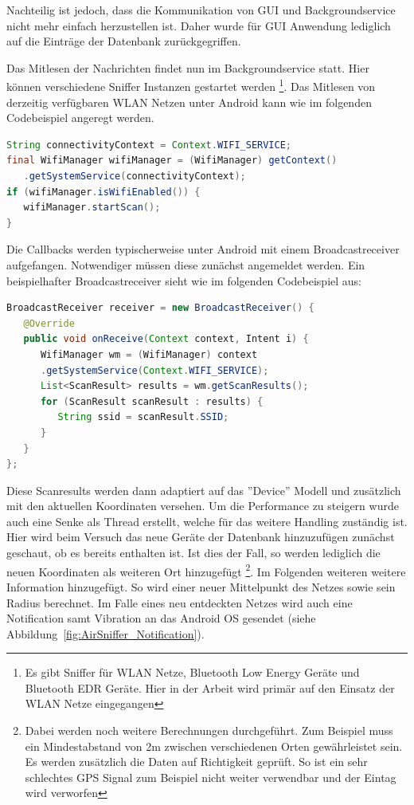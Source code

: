 \documentclass[11pt,a4paper]{article}
\begin{document}
Nachteilig ist jedoch, dass die Kommunikation von GUI und Backgroundservice nicht mehr einfach herzustellen ist. Daher wurde für GUI Anwendung lediglich auf die Einträge der Datenbank zurückgegriffen.

Das Mitlesen der Nachrichten findet nun im Backgroundservice statt. Hier können verschiedene Sniffer Instanzen gestartet werden
\footnote{Es gibt Sniffer für WLAN Netze, Bluetooth Low Energy Geräte und Bluetooth EDR Geräte. Hier in der Arbeit wird primär auf den Einsatz der WLAN Netze eingegangen}.
Das Mitlesen von derzeitig verfügbaren WLAN Netzen unter Android kann wie im folgenden Codebeispiel angeregt werden.

\begin{lstlisting}[language=Java]
String connectivityContext = Context.WIFI_SERVICE;
final WifiManager wifiManager = (WifiManager) getContext()
   .getSystemService(connectivityContext);
if (wifiManager.isWifiEnabled()) {
   wifiManager.startScan();
}
\end{lstlisting}

Die Callbacks werden typischerweise unter Android mit einem Broadcastreceiver aufgefangen. Notwendiger müssen diese zunächst angemeldet werden. Ein beispielhafter Broadcastreceiver sieht wie im folgenden Codebeispiel aus:

\begin{lstlisting}[language=Java]
BroadcastReceiver receiver = new BroadcastReceiver() {
   @Override
   public void onReceive(Context context, Intent i) {
      WifiManager wm = (WifiManager) context
      .getSystemService(Context.WIFI_SERVICE);
      List<ScanResult> results = wm.getScanResults();
      for (ScanResult scanResult : results) {
         String ssid = scanResult.SSID;
      }
   }
};
\end{lstlisting}

Diese Scanresults werden dann adaptiert auf das ''Device'' Modell und zusätzlich mit den aktuellen Koordinaten versehen. Um die Performance zu steigern wurde auch eine Senke als Thread erstellt, welche für das weitere Handling zuständig ist. Hier wird beim Versuch das neue Geräte der Datenbank hinzuzufügen zunächst geschaut, ob es bereits enthalten ist. Ist dies der Fall, so werden lediglich die neuen Koordinaten als weiteren Ort hinzugefügt
\footnote{Dabei werden noch weitere Berechnungen durchgeführt. Zum Beispiel muss ein Mindestabstand von 2m zwischen verschiedenen Orten gewährleistet sein. Es werden zusätzlich die Daten auf Richtigkeit geprüft. So ist ein sehr schlechtes GPS Signal zum Beispiel nicht weiter verwendbar und der Eintag wird verworfen}.
Im Folgenden weiteren weitere Information hinzugefügt. So wird einer neuer Mittelpunkt des Netzes sowie sein Radius berechnet. Im Falle eines neu entdeckten Netzes wird auch eine Notification samt Vibration an das Android OS gesendet (siehe Abbildung~\ref{fig:AirSniffer_Notification}).
\end{document}
